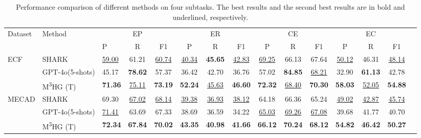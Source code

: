 \documentclass[11pt]{article}
\begin{document}
\begin{table}
  \centering
  \caption{Performance comparison of different methods on four subtasks. The best results and the second best
results are in bold and underlined, respectively.}
  \label{tab:sub_task}
  \renewcommand{\arraystretch}{1.05}
  \scriptsize
  \begin{tabular}{lllcccccccccccc}
  \toprule
  \multirow{2}{*}{Dataset} & \multirow{2}{*}{Method} & \multicolumn{3}{c}{EP} & \multicolumn{3}{c}{ER} & \multicolumn{3}{c}{CE} & \multicolumn{3}{c}{EC} \\
  \cmidrule(lr){3-5} \cmidrule(lr){6-8} \cmidrule(lr){9-11} \cmidrule(lr){12-14}
   & & P & R & F1 & P & R & F1 & P & R & F1 & P & R & F1 \\
  \midrule
  
  \multirow{3}{*}{ECF} 
    & SHARK             & \underline{59.00} & 61.21 & \underline{60.74} & \underline{40.34} & \textbf{45.65} & \underline{42.83} & \underline{69.25} & 66.13 & 67.64 & \underline{50.12} & 46.31 & \underline{48.14} \\
    & GPT-4o(5-shots)   & 45.17 & \textbf{78.62} & 57.37 & 36.42 & 42.70 & 36.76 & 57.02 & \textbf{84.85} & \underline{68.21} & 32.90 & \textbf{61.13} & 42.78 \\
    & M\textsuperscript{3}HG (T)     & \textbf{71.36} & \underline{75.11} & \textbf{73.19} & \textbf{52.24} & \underline{45.63} & \textbf{46.60} & \textbf{72.32} & \underline{68.40} & \textbf{70.30} & \textbf{58.03} & \underline{52.05} & \textbf{54.88} \\
  
  \midrule
  
  \multirow{3}{*}{MECAD}
    & SHARK             & 69.30 & \underline{67.02} & \underline{68.14} & \underline{39.38} & \underline{36.93} & \underline{38.12} & 64.18 & 66.36 & 65.24 & \underline{49.02} & \underline{42.87} & \underline{45.74} \\
    & GPT-4o(5-shots)   & \underline{71.41} & 63.69 & 67.33 & 38.69 & 36.59 & 34.22 & \underline{65.03} & \underline{69.26} & \underline{67.08} & 39.68 & 41.77 & 40.70 \\
    & M\textsuperscript{3}HG (T)     & \textbf{72.34} & \textbf{67.84} & \textbf{70.02} & \textbf{43.35} & \textbf{40.98} & \textbf{41.66} & \textbf{66.12} & \textbf{70.24} & \textbf{68.12} & \textbf{54.82} & \textbf{46.42} & \textbf{50.27} \\
  
  \bottomrule
  \end{tabular}
\end{table}
\end{document}
